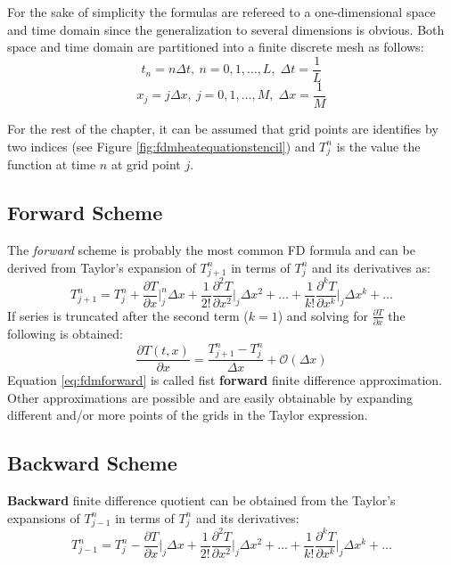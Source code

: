 For the sake of simplicity the formulas are refereed to a one-dimensional space and time domain since the generalization to several dimensions is obvious.
Both space and time domain are partitioned into a finite discrete mesh as follows:    
 \begin{equation}
    		t_n = n\Delta t, \: n = 0,1,\ldots,L,\; \Delta t= \frac{1}{L}
    \end{equation}
    \begin{equation}
    		x_j = j\Delta x, \: j = 0,1,\ldots,M,\;\Delta x = \frac{1}{M}
    \end{equation}

For the rest of the chapter, it can be assumed that grid points are identifies by two indices (see Figure \ref{fig:fdmheatequationstencil}) and $T_j^n$ is the value the function at time $n$ at grid point $j$.

\subsection{Forward Scheme}
    The \textit{forward} scheme is probably the most common FD formula and can be derived from Taylor's expansion of $T^n_{j+1}$ in terms of $T^n_{j}$ and its derivatives as:
    \begin{equation}
    T^n_{j+1} = T^n_{j} +
    \frac{\partial T}{\partial x}\bigg\rvert^n_j \Delta x +
    \frac{1}{2!}  \frac{\partial^2 T}{\partial x^2}\bigg\rvert_j \Delta x^2 + \ldots + 
     \frac{1}{k!}  \frac{\partial^k T}{\partial x^k}\bigg\rvert_j \Delta x^k + \ldots
     \label{eq:taylorexp1}
    \end{equation}    
    If series is truncated after the second term ($k=1$) and solving for $\frac{\partial T}{\partial x}$ the following is obtained:
    \begin{equation}
    \frac{\partial T(t,x)}{\partial x}  = \frac{T^n_{j+1} - T^n_{j}}{\Delta x} + \mathcal{O}(\Delta x)
    \label{eq:fdmforward}
    \end{equation}    
    Equation \ref{eq:fdmforward} is called fist \textbf{forward} finite difference approximation. Other approximations are possible and are easily obtainable by expanding different and/or more points of the grids in the Taylor expression.
    
  \subsection{Backward Scheme}  
    \textbf{Backward} finite difference quotient can be obtained from the Taylor's expansions of  $T^n_{j-1}$  in terms of $T^n_{j}$ and its derivatives:
    \begin{equation}
    T^n_{j-1} = T^n_{j} - 
    \frac{\partial T}{\partial x}\bigg\rvert_j \Delta x +
    \frac{1}{2!}  \frac{\partial^2 T}{\partial x^2}\bigg\rvert_j \Delta x^2 + \ldots + 
     \frac{1}{k!}  \frac{\partial^k T}{\partial x^k}\bigg\rvert_j \Delta x^k + \ldots
     \label{eq:taylorexp2}
    \end{equation}
    
